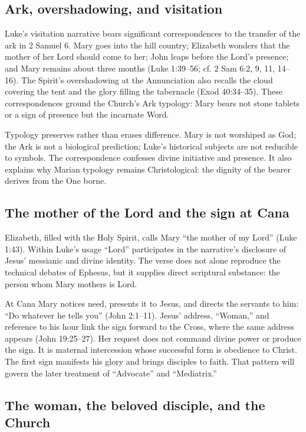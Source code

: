 \subsection{Ark, overshadowing, and visitation}

Luke's visitation narrative bears significant correspondences to the transfer of the ark in 2 Samuel 6. Mary goes into the hill country; Elizabeth wonders that the mother of her Lord should come to her; John leaps before the Lord's presence; and Mary remains about three months (Luke 1:39--56; cf. 2 Sam 6:2, 9, 11, 14--16). The Spirit's overshadowing at the Annunciation also recalls the cloud covering the tent and the glory filling the tabernacle (Exod 40:34--35). These correspondences ground the Church's Ark typology: Mary bears not stone tablets or a sign of presence but the incarnate Word.

Typology preserves rather than erases difference. Mary is not worshiped as God; the Ark is not a biological prediction; Luke's historical subjects are not reducible to symbols. The correspondence confesses divine initiative and presence. It also explains why Marian typology remains Christological: the dignity of the bearer derives from the One borne.

\subsection{The mother of the Lord and the sign at Cana}

Elizabeth, filled with the Holy Spirit, calls Mary ``the mother of my Lord'' (Luke 1:43). Within Luke's usage ``Lord'' participates in the narrative's disclosure of Jesus' messianic and divine identity. The verse does not alone reproduce the technical debates of Ephesus, but it supplies direct scriptural substance: the person whom Mary mothers is Lord.

At Cana Mary notices need, presents it to Jesus, and directs the servants to him: ``Do whatever he tells you'' (John 2:1--11). Jesus' address, ``Woman,'' and reference to his hour link the sign forward to the Cross, where the same address appears (John 19:25--27). Her request does not command divine power or produce the sign. It is maternal intercession whose successful form is obedience to Christ. The first sign manifests his glory and brings disciples to faith. That pattern will govern the later treatment of ``Advocate'' and ``Mediatrix.''

\subsection{The woman, the beloved disciple, and the Church}

